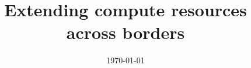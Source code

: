 \documentclass[%
a4paper]{article}
\title{Extending compute resources across borders}
\date{\today}
\begin{document}

\maketitle



%


\nocite{*} %



\end{document}
